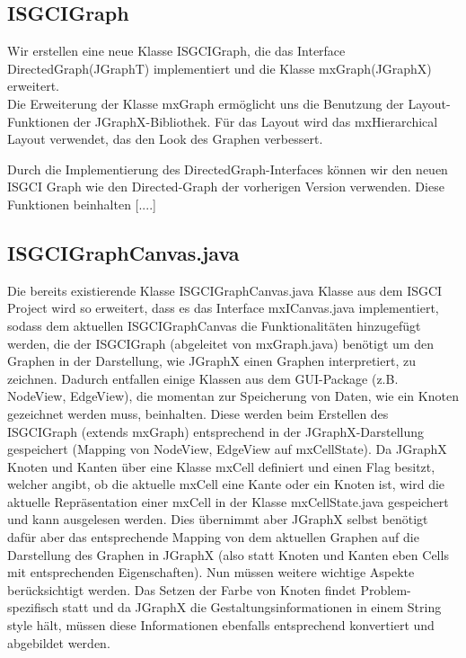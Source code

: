\documentclass[10pt,a4paper]{article}
\begin{document}
\subsection{ISGCIGraph}
Wir erstellen eine neue Klasse ISGCIGraph, die das Interface DirectedGraph(JGraphT) implementiert und die Klasse mxGraph(JGraphX) erweitert.\\
Die Erweiterung der Klasse mxGraph ermöglicht uns die Benutzung der Layout-Funktionen der JGraphX-Bibliothek. Für das Layout wird das mxHierarchical Layout verwendet, das den Look des Graphen verbessert. 


Durch die Implementierung des DirectedGraph-Interfaces können wir den neuen ISGCI Graph wie den Directed-Graph der vorherigen Version verwenden. Diese Funktionen beinhalten [....]

\subsection{ISGCIGraphCanvas.java}
Die bereits existierende Klasse ISGCIGraphCanvas.java Klasse aus dem ISGCI Project wird so erweitert, dass es das Interface mxICanvas.java implementiert, sodass dem aktuellen ISGCIGraphCanvas die Funktionalitäten hinzugefügt werden, die der ISGCIGraph (abgeleitet von mxGraph.java) benötigt um den Graphen in der Darstellung, wie JGraphX einen Graphen interpretiert, zu zeichnen. Dadurch entfallen einige Klassen aus dem GUI-Package (z.B. NodeView, EdgeView), die momentan zur Speicherung von Daten, wie ein Knoten gezeichnet werden muss, beinhalten. Diese werden beim Erstellen des ISGCIGraph (extends mxGraph) entsprechend in der JGraphX-Darstellung gespeichert (Mapping von NodeView, EdgeView auf mxCellState). Da JGraphX Knoten und Kanten über eine Klasse mxCell definiert und einen Flag besitzt, welcher angibt, ob die aktuelle mxCell eine Kante oder ein Knoten ist, wird die aktuelle Repräsentation einer mxCell in der Klasse mxCellState.java gespeichert und kann ausgelesen werden. Dies übernimmt aber JGraphX selbst benötigt dafür aber das entsprechende Mapping von dem aktuellen Graphen auf die Darstellung des Graphen in JGraphX (also statt Knoten und Kanten eben Cells mit entsprechenden Eigenschaften). Nun müssen weitere wichtige Aspekte berücksichtigt werden. Das Setzen der Farbe von Knoten findet Problem-spezifisch statt und da JGraphX die Gestaltungsinformationen in einem String style hält, müssen diese Informationen ebenfalls entsprechend konvertiert und abgebildet werden. 
\end{document}
